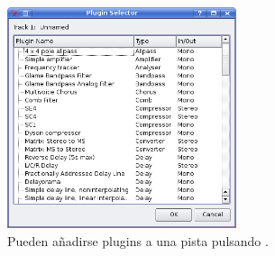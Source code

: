 \begin{figure}[t]
 \centering\includegraphics[width=0.6\textwidth]{../images/plugin-list}
 \caption{Pueden añadirse plugins a una pista pulsando .}
 \label{fig_pluglist}
\end{figure}


